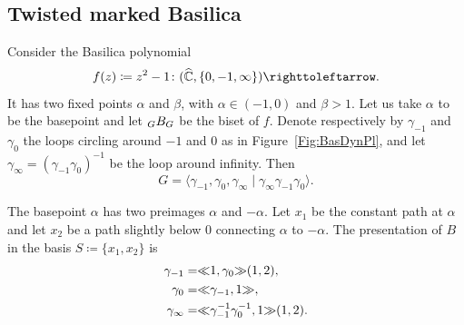 \documentclass{amsart}
\begin{document}
\subsection{Twisted marked Basilica}
Consider the Basilica polynomial
\[f(z)\coloneqq z^2-1\colon (\widehat\C,\{0,-1,\infty\})\selfmap.
\]
It has two fixed points $\alpha$ and $\beta$, with $\alpha\in(-1,0)$
and $\beta>1$. Let us take $\alpha$ to be the basepoint and let
$\subscript G B_G$ be the biset of $f$. Denote respectively by
$\gamma_{-1}$ and $\gamma_0$ the loops circling around $-1$ and $0$
as in Figure~\ref{Fig:BasDynPl}, and let
$\gamma_\infty=(\gamma_{-1} \gamma_0)^{-1}$ be the loop around
infinity. Then
\[G=\langle\gamma_{-1},\gamma_0,\gamma_\infty\mid \gamma_\infty \gamma_{-1}\gamma_0\rangle. \]

The basepoint $\alpha$ has two preimages $\alpha$ and $-\alpha$. Let
$x_1$ be the constant path at $\alpha$ and let $x_2$ be a path
slightly below $0$ connecting $\alpha$ to $-\alpha$. The presentation
of $B$ in the basis $S\coloneqq \{x_1,x_2\}$ is
\begin{align*}
  \gamma_{-1}=&{\ll}1,\gamma_0{\gg}(1,2),\\
  \gamma_0=&{\ll}\gamma_{-1},1{\gg},\\
  \gamma_\infty=&{\ll}\gamma_{-1}^{-1}\gamma^{-1}_0,1{\gg}(1,2).
\end{align*}
\end{document}
